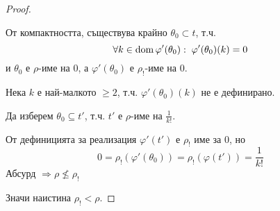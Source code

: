 \begin{proof}
\begin{itemize}
              От компактността, съществува крайно $\theta_0 \subset t$, т.ч.
              \begin{equation}
                  \forall k \in \operatorname*{dom}\varphi'(\theta_0):\; \varphi'(\theta_0)(k) = 0
              \end{equation}
              и $\theta_0$ е $\rho$-име на 0, а $\varphi'(\theta_0)$ е $\rho_!$-име на 0.

              Нека $k$ е най-малкото $\geq 2$, т.ч. $\varphi'(\theta_0)(k)$ не е дефинирано.

              Да изберем $\theta_0 \subseteq t'$, т.ч. $t'$ е $\rho$-име на $\frac{1}{k!}$.

              От дефиницията за реализация $\varphi'(t')$ е $\rho_!$ име за $0$, но
              \begin{equation}
                  0 = \rho_!(\varphi'(\theta_0)) = \rho_!(\varphi(t')) = \frac{1}{k!}
              \end{equation}
              Абсурд $\Rightarrow \rho \nleq \rho_!$
    \end{itemize}
    Значи наистина $\rho_! < \rho$.
\end{proof}

